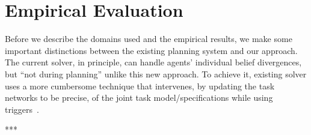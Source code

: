 \documentclass[letterpaper]{article} %
\begin{document}








\section{Empirical Evaluation}
Before we describe the domains used and the empirical results, we make some important distinctions between the existing planning system and our approach. The current solver, in principle, can handle agents' individual belief divergences, but ``not during planning'' unlike this new approach. To achieve it, existing solver uses a more cumbersome technique that intervenes, by updating the task networks to be precise, of the joint task model/specifications while using triggers~\cite{thesisBuisan21}. 
% 

***
\end{document}
